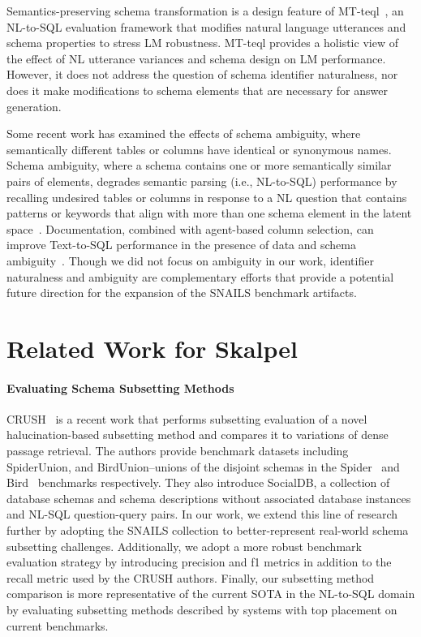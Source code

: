 Semantics-preserving schema transformation is a design feature of MT-teql~\cite{10.14778/3494124.3494139}, an NL-to-SQL evaluation framework that modifies natural language utterances and schema properties to stress LM robustness.
MT-teql provides a holistic view of the effect of NL utterance variances and schema design on LM performance. 
However, it does not address the question of schema identifier naturalness, nor does it make modifications to schema elements that are necessary for answer generation. 

Some recent work has examined the effects of schema ambiguity, where semantically different tables or columns have identical or synonymous names.
Schema ambiguity, where a schema contains one or more semantically similar pairs of elements, degrades semantic parsing (i.e., NL-to-SQL) performance by recalling undesired tables or columns in response to a NL question that contains patterns or keywords that align with more than one schema element in the latent space~\cite{10555063}.
Documentation, combined with agent-based column selection, can improve Text-to-SQL performance in the presence of data and schema ambiguity~\cite{huang2023data}.
Though we did not focus on ambiguity in our work, identifier naturalness and ambiguity are complementary efforts that provide a potential future direction for the expansion of the SNAILS benchmark artifacts. 


\section{Related Work for Skalpel}


\paragraph{\textbf{Evaluating Schema Subsetting Methods}}
CRUSH~\cite{kothyari-etal-2023-crush4sql} is a recent work that performs subsetting evaluation of a novel halucination-based subsetting method and compares it to variations of dense passage retrieval.
The authors provide benchmark datasets including SpiderUnion, and BirdUnion--unions of the disjoint schemas in the Spider~\cite{benchmark-spider} and Bird~\cite{benchmark-bird} benchmarks respectively. They also introduce SocialDB, a collection of database schemas and schema descriptions without associated database instances and NL-SQL question-query pairs.
In our work, we extend this line of research further by adopting the  SNAILS collection to better-represent real-world schema subsetting challenges.
Additionally, we adopt a more robust benchmark evaluation strategy by introducing precision and f1 metrics in addition to the recall metric used by the CRUSH authors.
Finally, our subsetting method comparison is more representative of the current SOTA in the NL-to-SQL domain by evaluating subsetting methods described by systems with top placement on current benchmarks.


